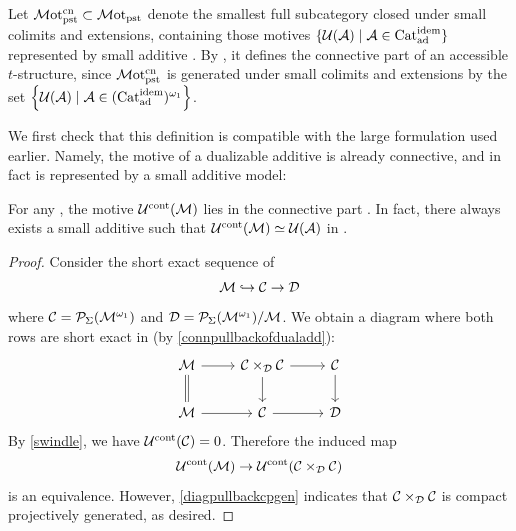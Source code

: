 \documentclass[a4paper,10pt, oneside]{amsart}
\begin{document}
\begin{de}
	Let $\mathcal{M}\mathrm{ot}^{\mathrm{cn}}_{\mathrm{pst}}\subset \mathcal{M}\mathrm{ot}_{\mathrm{pst}}$ denote the smallest full subcategory closed under small colimits and extensions, containing those motives $\{\mathcal{U}(\mathcal{A})\mid \mathcal{A}\in\mathrm{Cat}_{\mathrm{ad}}^{\mathrm{idem}}\}$ represented by small additive \infcats. 
	By \cite[Lemma 1.4.4.11]{ha}, it defines the connective part of an accessible $t$-structure, since $\mathcal{M}\mathrm{ot}^{\mathrm{cn}}_{\mathrm{pst}}$ is generated under small colimits and extensions by the set $\left\{\mathcal{U}(\mathcal{A})\mid \mathcal{A}\in (\mathrm{Cat}_{\mathrm{ad}}^{\mathrm{idem}})^{\omega_1}\right\}$.
\end{de}
We first check that this definition is compatible with the large formulation
used earlier.  Namely, the motive of a dualizable additive \infcat is already
connective, and in fact is represented by a small additive model:
\begin{prop}\label{tmot1}
	For any \dualaddinfcat \mcm, the motive $\mathcal{U}^{\mathrm{cont}}(\mathcal{M})$ lies in the connective part \motpstcn. In fact, there always exists a small additive \infcat \mca such that $\mathcal{U}^{\mathrm{cont}}(\mathcal{M})\simeq \mathcal{U}(\mathcal{A})$ in \motpst.
\end{prop}
	\begin{proof}
	Consider the short exact sequence of \dualaddinfcats
	$$\mathcal{M}\hookrightarrow \mathcal{C}\to \mathcal{D}$$
	where $\mathcal{C}=\mathcal{P}_{\Sigma}(\mathcal{M}^{\omega_1})$ and $\mathcal{D}=\mathcal{P}_{\Sigma}(\mathcal{M}^{\omega_1})/\mathcal{M}$.
	We obtain a diagram where both rows are short exact in \praddbl (by \cref{connpullbackofdualadd}):
	$$\begin{tikzcd}
		\mcm \arrow[d, Rightarrow, no head] \arrow[r] & \mcc\times_{\mcd}\mcc \arrow[d] \arrow[r] & \mcc \arrow[d] \\
		\mcm \arrow[r]                                & \mcc \arrow[r]                            & \mcd          
	\end{tikzcd}
	$$
	By \cref{swindle}, we have $\mathcal{U}^{\mathrm{cont}}(\mathcal{C})=0$. Therefore the induced map $$\mathcal{U}^{\mathrm{cont}}(\mathcal{M})\to \mathcal{U}^{\mathrm{cont}}(\mathcal{C}\times_{\mathcal{D}}\mathcal{C})$$ is an equivalence. However, \cref{diagpullbackcpgen} indicates that $\mathcal{C}\times_{\mathcal{D}}\mathcal{C}$ is compact projectively generated, as desired.
	\end{proof}
	
\end{document}
